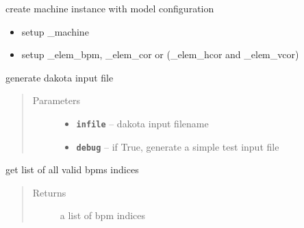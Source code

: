 \documentclass[letterpaper,10pt,english]{sphinxmanual}
\begin{document}
\begin{fulllineitems}

\begin{fulllineitems}
\label{src/apidocs/dakopt:genopt.dakopt.DakotaOC.create_machine}
create machine instance with model configuration
\begin{itemize}
\item {} 
setup \_machine

\item {} 
setup \_elem\_bpm, \_elem\_cor or (\_elem\_hcor and \_elem\_vcor)

\end{itemize}

\end{fulllineitems}


\begin{fulllineitems}
\label{src/apidocs/dakopt:genopt.dakopt.DakotaOC.gen_dakota_input}
generate dakota input file
\begin{quote}\begin{description}
\item[{Parameters}] \leavevmode\begin{itemize}
\item {} 
\textbf{\texttt{infile}} -- dakota input filename

\item {} 
\textbf{\texttt{debug}} -- if True, generate a simple test input file

\end{itemize}

\end{description}\end{quote}

\end{fulllineitems}


\begin{fulllineitems}
\label{src/apidocs/dakopt:genopt.dakopt.DakotaOC.get_all_bpms}
get list of all valid bpms indices
\begin{quote}\begin{description}
\item[{Returns}] \leavevmode
a list of bpm indices


\end{description}
\end{quote}
\end{fulllineitems}
\end{fulllineitems}
\end{document}
